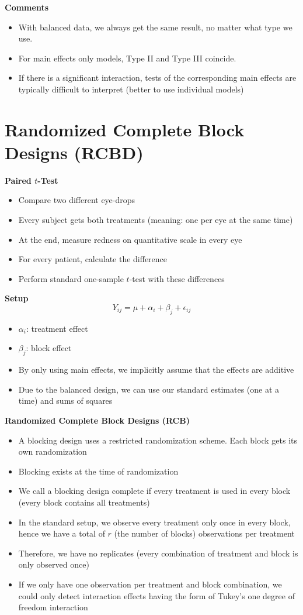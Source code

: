 \documentclass[a4paper]{article}
\begin{document}
\textbf{Comments}
\begin{itemize}
    \item With balanced data, we always get the same result, no matter what type we use.
    \item For main effects only models, Type II and Type III coincide.
    \item If there is a significant interaction, tests of the corresponding main effects are typically difficult to interpret (better to use individual models)
\end{itemize}

\section{Randomized Complete Block Designs (RCBD)}

\textbf{Paired $t$-Test}
\begin{itemize}
    \item Compare two different eye-drops
    \item Every subject gets both treatments (meaning: one per eye at the same time)
    \item At the end, measure redness on quantitative scale in every eye
    \item For every patient, calculate the difference
    \item Perform standard one-sample $t$-test with these differences
\end{itemize}

\textbf{Setup}
\[Y_{ij}=\mu+\alpha_i+\beta_j+\epsilon_{ij} \]
\begin{itemize}
    \item $\alpha_i$: treatment effect
    \item $\beta_j$: block effect
    \item By only using main effects, we implicitly assume that the effects are additive
    \item Due to the balanced design, we can use our standard estimates (one at a time) and sums of squares
\end{itemize}

\textbf{Randomized Complete Block Designs (RCB)}
\begin{itemize}
    \item A blocking design uses a restricted randomization scheme. Each block gets its own randomization
    \item Blocking exists at the time of randomization
    \item We call a blocking design complete if every treatment is used in every block (every block contains all treatments)
    \item In the standard setup, we observe every treatment only once in every block, hence we have a total of $r$ (the number of blocks) observations per treatment
    \item Therefore, we have no replicates (every combination of treatment and block is only observed once)
    \item If we only have one observation per treatment and block combination, we could only detect interaction effects having the form of Tukey's one degree of freedom interaction
\end{itemize}
\end{document}
